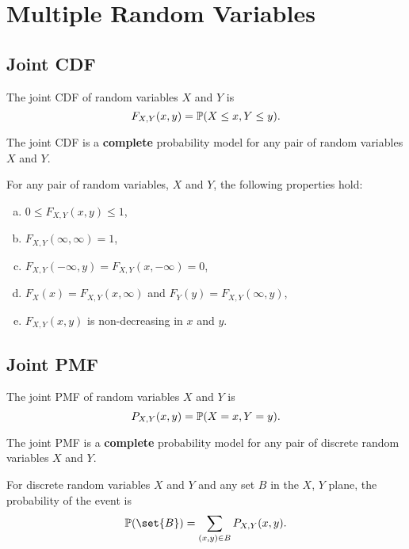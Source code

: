\chapter{Multiple Random Variables}

\section{Joint CDF}
\begin{definition}
    The joint CDF of random variables $X$ and $Y$ is
    \[F_{X,Y}(x,y) = \P{X\leq x, Y\leq y}.\]
\end{definition}

The joint CDF is a \textbf{complete} probability model for any pair of random variables $X$ and $Y$.

\begin{theorem}
    For any pair of random variables, $X$ and $Y$, the following properties hold:
    \begin{enumerate}[(a)]
        \item $0 \leq F_{X,Y}(x,y) \leq 1$,
        \item $F_{X,Y}(\infty,\infty)=1$,
        \item $F_{X,Y}(-\infty,y)=F_{X,Y}(x,-\infty)=0$,
        \item $F_X(x)=F_{X,Y}(x,\infty)$ and $F_Y(y)=F_{X,Y}(\infty,y)$,
        \item $F_{X,Y}(x,y)$ is non-decreasing in $x$ and $y$.
    \end{enumerate}
\end{theorem}

\section{Joint PMF}
\begin{definition}
    The joint PMF of random variables $X$ and $Y$ is
    \[P_{X,Y}(x,y) = \P{X=x, Y=y}.\]
\end{definition}

The joint PMF is a \textbf{complete} probability model for any pair of discrete random variables $X$ and $Y$.

\begin{theorem}
    For discrete random variables $X$ and $Y$ and any set $B$ in the $X$, $Y$ plane, the probability of the event
    is
    \[\P{\set{B}}=\sum_{(x,y)\in B}P_{X,Y}(x,y).\]
\end{theorem}

